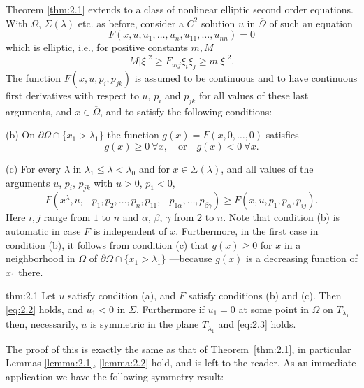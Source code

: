  Theorem \ref{thm:2.1} extends to a class of nonlinear elliptic second order equations.
With $\Omega$, $\Sigma(\lambda)$ etc.\! as before, consider a $C^2$ solution $u$
in $\overline{\Omega}$ of such an equation
\begin{equation}\label{eq:2.1prime}
  F(x, u, u_1, \ldots, u_n, u_{11}, \ldots, u_{nn}) = 0 \tag{$2.1'$}
\end{equation}
which is elliptic, i.e., for positive constants $m,M$
\[M|\xi|^2 \geq F_{uij}\xi_i\xi_j \geq m|\xi|^2.\]
The function $F(x, u, p_i, p_{jk})$ is assumed to be continuous and to have continuous first
derivatives with respect to $u$, $p_i$ and $p_{jk}$ for all values of these last arguments,
and $x\in\overline{\Omega}$, and to satisfy the following conditions:

(b) On $\partial\Omega\cap\{x_1>\lambda_1\}$ the function $g(x) = F(x,0,\ldots,0)$
satisfies
\[g(x)\geq 0\ \forall x, \quad \text{or} \quad
  g(x)<0\ \forall x.\]

(c) For every $\lambda$ in $\lambda_1\leq\lambda<\lambda_0$
and for $x\in\Sigma(\lambda)$, and all values of the arguments $u$, $p_i$,
$p_{jk}$ with $u>0$, $p_1<0$,
\begin{equation}\label{eq:2.6}
  F(x^\lambda, u, -p_1, p_2, \ldots, p_n, p_{11}, -p_{1\alpha}, \ldots,
    p_{\beta\gamma}) \geq F(x,u,p_1,p_{\alpha},p_{ij}).
\end{equation}
Here $i,j$ range from $1$ to $n$ and $\alpha$, $\beta$, $\gamma$
from $2$ to $n$.
Note that condition (b) is automatic in case $F$ is independent of $x$.
Furthermore, in the first case in condition (b),
it follows from condition (c) that $g(x)\geq 0$
for $x$ in a neighborhood in $\Omega$ of $\partial\Omega\cap\{x_1>\lambda_1\}$%
---because $g(x)$ is a decreasing function of $x_1$ there.

\begin{theoremp}{thm:2.1}\label{thm:2.1prime}
  Let $u$ satisfy condition (a), and $F$ satisfy conditions (b) and (c).
  Then \eqref{eq:2.2} holds, and $u_1<0$ in $\Sigma$.
  Furthermore if $u_1=0$ at some point in $\Omega$ on $T_{\lambda_1}$ then,
  necessarily, $u$ is symmetric in the plane $T_{\lambda_1}$ and \eqref{eq:2.3} holds.
\end{theoremp}

The proof of this is exactly the same as that of Theorem~\ref{thm:2.1},
in particular Lemmas \ref{lemma:2.1}, \ref{lemma:2.2} hold,
and is left to the reader. As an immediate application we have the following symmetry result:

